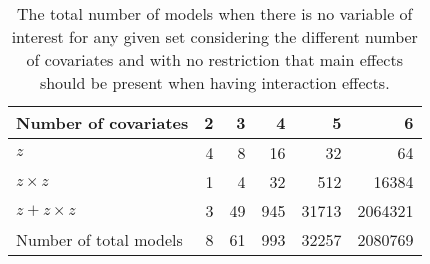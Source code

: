 \begin{table}[!h]
\centering
\caption{The total number of models when there is no variable of interest for any given set considering the different number of covariates and with no restriction that main effects should be present when having interaction effects.} 
\begin{tabular}{lrrrrr}
  \hline
Number of covariates & 2 & 3 & 4 & 5 & 6 \\ 
  \hline
  $ z$ & 4 & 8 & 16 & 32 & 64 \\ 
  $z \times z$ & 1 & 4 & 32 & 512 & 16384 \\ 
  $ z + z \times z$ & 3 & 49 & 945 & 31713 & 2064321 \\ 
  \hline
  Number of total models & 8 & 61 & 993 & 32257 & 2080769 \\ 
   \hline
\end{tabular}
\end{table}
